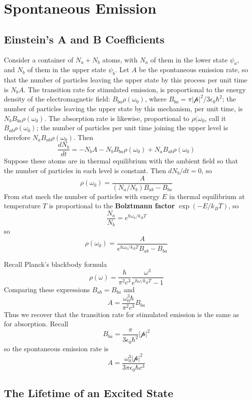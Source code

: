 \documentclass[12pt, a4paper, oneside, openright, titlepage]{book}
\begin{document}
\section{Spontaneous Emission}


\subsection{Einstein's A and B Coefficients}

Consider a container of $N_a+N_b$ atoms, with $N_a$ of them in the lower state $\psi_a$, and $N_b$ of them in the upper state $\psi_b$. Let $A$ be the spontaneous emission rate, so that the number of particles leaving the upper state by this process per unit time is $N_bA$. The transition rate for stimulated emission, is proportional to the energy density of the electromagnetic field: $B_{ba}\rho(\omega_0)$, where $B_{ba} = \pi|\mathbf{\mathcal{p}}|^2/3\epsilon_0\hbar^2$; the number of particles leaving the upper state by this mechanism, per unit time, is $N_bB_{ba}\rho(\omega_0)$. The absorption rate is likewise, proportional to $\rho(\omega_0$, call it $B_{ab}\rho(\omega_0)$; the number of particles per unit time joining the upper level is therefore $N_aB_{ab}\rho(\omega_0)$. Then $$\frac{dN_b}{dt} = -N_bA-N_bB_{ba}\rho(\omega_0)+N_aB_{ab}\rho(\omega_0)$$
Suppose these atoms are in thermal equilibrium with the ambient field so that the number of particles in each level is constant. Then $dN_b/dt = 0$, so $$\rho(\omega_0) = \frac{A}{(N_a/N_b)B_{ab}-B_{ba}}$$
From stat mech the number of particles with energy $E$ in thermal equilibrium at temperature $T$ is proportional to the \textbf{Bolztmann factor} $\exp(-E/k_BT)$, so $$\frac{N_a}{N_b} = e^{\hbar\omega_0/k_BT}$$
so $$\rho(\omega_0) = \frac{A}{e^{\hbar\omega_0/k_BT}B_{ab}-B_{ba}}$$

Recall Planck's blackbody formula $$\rho(\omega) = \frac{\hbar}{\pi^2c^3}\frac{\omega^3}{e^{\hbar\omega/k_BT}-1}$$
Comparing these expressions $B_{ab} = B_{ba}$ and $$A = \frac{\omega_0^3\hbar}{\pi^2c^3}B_{ba}$$
Thus we recover that the transition rate for stimulated emission is the same as for absorption. Recall $$B_{ba} = \frac{\pi}{3\epsilon_0\hbar^2}|\mathbf{\mathcal{p}}|^2$$
so the spontaneous emission rate is $$A = \frac{\omega_0^3|\mathbf{\mathcal{p}}|^2}{3\pi\epsilon_0\hbar c^3}$$

\subsection{The Lifetime of an Excited State}
\end{document}
